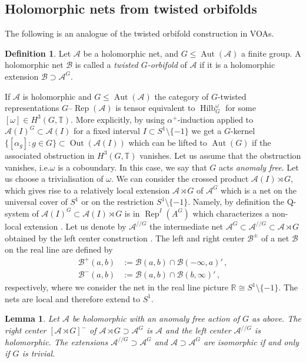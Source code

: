 \documentclass[twoside,11pt,reqno]{amsart}
\makeatletter
\newtheorem{lem}[thm]{Lemma}
\theoremstyle{definition}
\newtheorem{defi}[thm]{Definition}
\theoremstyle{remark}
\newcommand{\cB}{\mathcal{B}}
\newcommand{\A}{\mathcal{A}}
\newcommand{\RR}{\mathbb{R}}
\newcommand{\TT}{\mathbb{T}}
\DeclareMathOperator{\Rep}{Rep}
\DeclareMathOperator{\Aut}{Aut}
\DeclareRobustCommand{\ie}{i.e.\@\xspace}
\DeclareMathOperator{\Out}{Out}
\DeclareMathOperator{\Vect}{Hilb}
\newcommand{\tRep}[1]{#1\text{--}\Rep}
\newcommand{\myemph}[1]{\emph{#1}}
\makeatother
\begin{document}
\subsection{Holomorphic nets from twisted orbifolds}
\label{ssec:HolomorphicNets}
The following is an analogue of the twisted orbifold construction in VOAs. 

\newcommand{\TO}{/\!/}
\begin{defi}
  Let $\A$ be a holomorphic net, and $G\leq \Aut(\A)$ a finite group.
  A holomorphic net $\cB$ is called a \myemph{twisted $G$-orbifold}
  of $\A$ if it is a holomorphic extension $\cB\supset  \A^G$.
\end{defi}
If $\A$ is holomorphic and $G\leq \Aut(\A)$ the category of 
$G$-twisted representations $\tRep G(\A)$ is tensor equivalent to 
$\Vect_G^{\omega}$ for some $[\omega]\in H^3(G,\TT)$.
More explicitly, by using $\alpha^+$-induction applied to $\A(I)^G\subset\A(I)$ for a fixed interval $I\subset S^1\setminus \{-1\}$
we get a $G$-kernel $\{[\alpha_g]:g\in G\} \subset \Out(\A(I))$ which can be 
lifted to $\Aut(G)$ if the associated obstruction in $H^3(G,\TT)$ vanishes.
Let us assume that the obstruction vanishes, \ie $\omega$ is a coboundary. 
In this case, we say that $G$ acts \myemph{anomaly free}.
Let us choose a trivialisation of $\omega$.
We can consider the crossed product $\A(I)\rtimes G$, which gives rise to a 
relatively local extension $\A\rtimes G$ of $\A^G$ which is a net on the 
universal cover of $S^1$ or on the restriction $S^1\setminus \{-1\}$. 
Namely, by definition the Q-system of $\A(I)^G\subset \A(I)\rtimes G$ is in 
$\Rep^I(A^G)$ which characterizes a non-local extension 
\cite{LoRe1995,LoRe2004}.
Let us denote by $\A^{\TO G}$ the intermediate net 
$\A^G\subset \A^{\TO G}\subset \A\rtimes G$ obtained by the left center 
construction \cite{BiKaLoRe2014}. 
The left and right center $\cB^\pm$ of a net $\cB$ on the real line are defined 
by
\begin{align}
  \cB^+(a,b) &:= \cB(a,b) \cap 
  \cB(-\infty,a)'\,,\\
  \cB^-(a,b) 
    &:= \cB(a,b) \cap \cB(b,\infty)'\,,
\end{align}
respectively, where we consider the net in the real line picture 
$\RR\cong S^1\setminus\{-1\}$. 
The nets are local and therefore extend to $S^1$. %
\begin{lem}
  Let $\A$ be holomorphic with an anomaly free action of $G$ as above. 
  The right center $[\A\rtimes G]^-$ of $\A\rtimes G\supset \A^G$ is $\A$
  and the left center $\A^{\TO G}$ is holomorphic. 
  The extensions  $\A^{\TO G}\supset \A^G$  and $\A\supset \A^G$
  are isomorphic if and only if $G$ is trivial.
\end{lem} 
\end{document}
